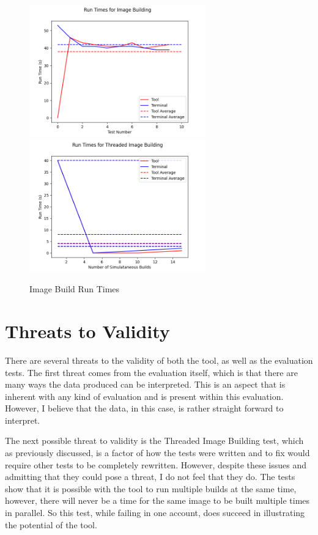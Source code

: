 \begin{figure}[h!]
  \includegraphics[width=3in]{images/evaluation/run7/image-build}
  \includegraphics[width=3in]{images/evaluation/run7/thread-image-build}
  \caption{Image Build Run Times}
  \label{img:imageBuild}
\end{figure}



\section{Threats to Validity}
\label{sec:threats}

There are several threats to the validity of both the tool, as well as the evaluation tests. The first threat comes from the evaluation itself, which is that there are many ways the data produced can be interpreted. This is an aspect that is inherent with any kind of evaluation and is present within this evaluation. However, I believe that the data, in this case, is rather straight forward to interpret.

The next possible threat to validity is the Threaded Image Building test, which as previously discussed, is a factor of how the tests were written and to fix would require other tests to be completely rewritten. However, despite these issues and admitting that they could pose a threat, I do not feel that they do. The tests show that it is possible with the tool to run multiple builds at the same time, however, there will never be a time for the same image to be built multiple times in parallel. So this test, while failing in one account, does succeed in illustrating the potential of the tool.

